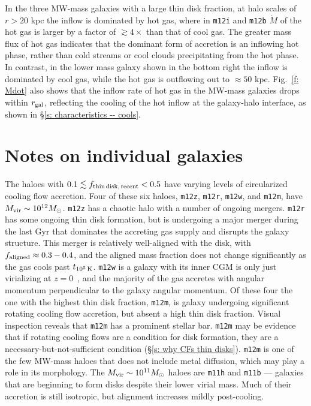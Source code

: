 \documentclass[fleqn,usenatbib]{mnras}
\newcommand{\fthin}{f_{\rm thin\,disk,\,recent}}
\newcommand{\tcools}{t_{10^5\,{\rm K}}}
\newcommand{\Mdot}{\dot{M}}
\begin{document}
In the three MW-mass galaxies with a large thin disk fraction, at halo scales of $r>20$ kpc the inflow is dominated by hot gas, where in \texttt{m12i} and \texttt{m12b} $\Mdot$ of the hot gas is larger by a factor of $\gtrsim 4\times$ than that of cool gas.
The greater mass flux of hot gas indicates that the dominant form of accretion is an inflowing hot phase, rather than cold streams or cool clouds precipitating from the hot phase.
In contrast, in the lower mass galaxy shown in the bottom right the inflow is dominated by cool gas, while the hot gas is outflowing out to $\approx50$ kpc.
Fig.~\ref{f: Mdot} also shows that the inflow rate of hot gas in the MW-mass galaxies drops within $r_{\rm gal}$, reflecting the cooling of the hot inflow at the galaxy-halo interface, as shown in \S\ref{s: characteristics -- cools}.

\section{Notes on individual galaxies}

\label{s: appendix-individual}

The haloes with $0.1 \lesssim \fthin < 0.5$ have varying levels of circularized cooling flow accretion.
Four of these six haloes, \texttt{m12z}, \texttt{m12r}, \texttt{m12w}, and \texttt{m12m}, have $M_{\rm vir} \sim 10^{12} M_\odot$.
\texttt{m12z} has a chaotic halo with a number of ongoing mergers.
\texttt{m12r} has some ongoing thin disk formation, but is undergoing a major merger during the last Gyr that dominates the accreting gas supply and disrupts the galaxy structure.
This merger is relatively well-aligned with the disk, with $f_{\rm aligned} \approx 0.3-0.4$, and the aligned mass fraction does not change significantly as the gas cools past $\tcools$.
\texttt{m12w} is a galaxy with its inner CGM is only just virializing at $z=0$~\citep{Yu2021}, and the majority of the gas accretes with angular momentum perpendicular to the galaxy angular momentum.
Of these four the one with the highest thin disk fraction, \texttt{m12m}, is galaxy undergoing significant rotating cooling flow accretion, but absent a high thin disk fraction.
Visual inspection reveals that \texttt{m12m} has a prominent stellar bar.
\texttt{m12m} may be evidence that if rotating cooling flows are a condition for disk formation, they are a necessary-but-not-sufficient condition (\S\ref{s: why CFs thin disks}).
\texttt{m12m} is one of the few MW-mass haloes that does not include metal diffusion, which may play a role in its morphology.
The $M_{\rm vir} \sim 10^{11} M_\odot$ haloes are \texttt{m11h} and \texttt{m11b} --- galaxies that are beginning to form disks despite their lower virial mass.
Much of their accretion is still isotropic, but alignment increases mildly post-cooling.


\bsp	%
\label{lastpage}
\end{document}
